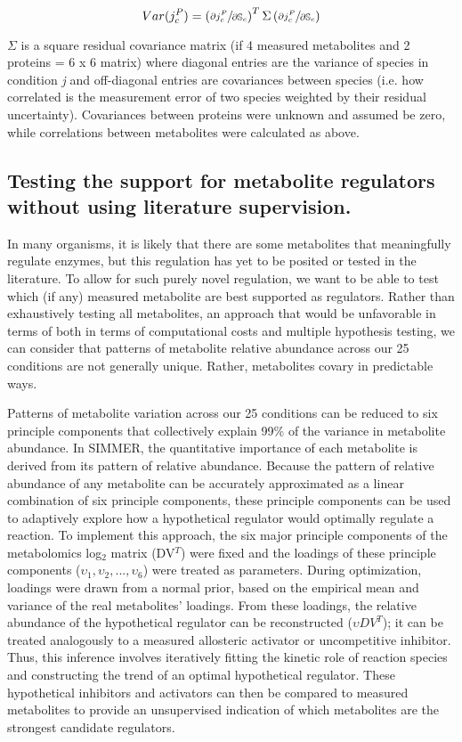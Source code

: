 \begin{equation}
Var(j^{P}_{c}) = \left(\sfrac{\partial j^{P}_{c}}{\partial\mathbb{S}_{c}}\right)^{T}\Sigma\left(\sfrac{\partial j^{P}_{c}}{\partial\mathbb{S}_{c}}\right)\label{propUncertainty}
\end{equation}

$\Sigma$ is a square residual covariance matrix (if 4 measured metabolites and 2 proteins = 6 x 6 matrix) where diagonal entries are the variance of species in condition \textit{j} and off-diagonal entries are covariances between species (i.e. how correlated is the measurement error of two species weighted by their residual uncertainty).  Covariances between proteins were unknown and assumed be zero, while correlations between metabolites were calculated as above.

\subsection*{Testing the support for metabolite regulators without using literature supervision.\label{simmer_hyporeg}}

In many organisms, it is likely that there are some metabolites that meaningfully regulate enzymes, but this regulation has yet to be posited or tested in the literature.  To allow for such purely novel regulation, we want to be able to test which (if any) measured metabolite are best supported as regulators.  Rather than exhaustively testing all metabolites, an approach that would be unfavorable in terms of both in terms of computational costs and multiple hypothesis testing, we can consider that patterns of metabolite relative abundance across our 25 conditions are not generally unique. Rather, metabolites covary in predictable ways.  

Patterns of metabolite variation across our 25 conditions can be reduced to six principle components that collectively explain 99\% of the variance in metabolite abundance.  In SIMMER, the quantitative importance of each metabolite is derived from its pattern of relative abundance. Because the pattern of relative abundance of any metabolite can be accurately approximated as a linear combination of six principle components, these principle components can be used to adaptively explore how a hypothetical regulator would optimally regulate a reaction.  To implement this approach, the six major principle components of the metabolomics log$_{2}$ matrix (DV$^{T}$) were fixed and the loadings of these principle components ($\upsilon_{1}, \upsilon_{2}, ..., \upsilon_{6}$) were treated as parameters.  During optimization, loadings were drawn from a normal prior, based on the empirical mean and variance of the real metabolites' loadings.  From these loadings, the relative abundance of the hypothetical regulator can be reconstructed ($\upsilon DV^{T}$); it can be treated analogously to a measured allosteric activator or uncompetitive inhibitor.  Thus, this inference involves iteratively fitting the kinetic role of reaction species and constructing the trend of an optimal hypothetical regulator.  These hypothetical inhibitors and activators can then be compared to measured metabolites to provide an unsupervised indication of which metabolites are the strongest candidate regulators.


